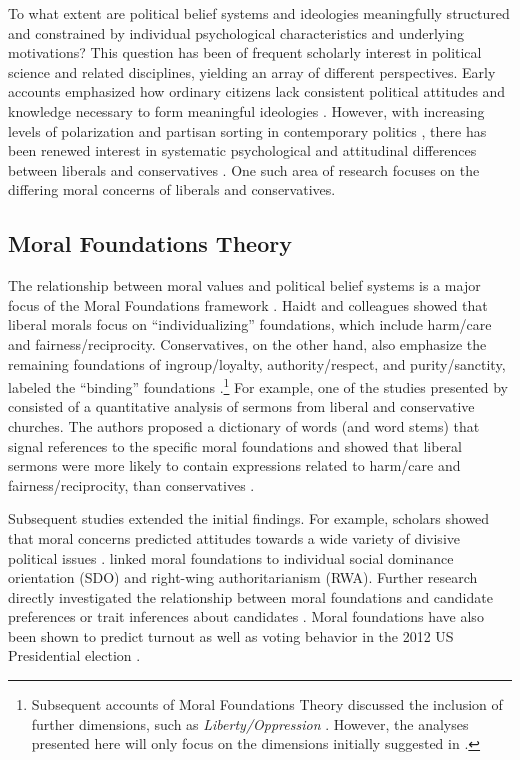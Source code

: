\documentclass[12pt]{article}
\begin{document}
To what extent are political belief systems and ideologies meaningfully structured and constrained by individual psychological characteristics and underlying motivations? This question has been of frequent scholarly interest in political science and related disciplines, yielding an array of different perspectives. Early accounts emphasized how ordinary citizens lack consistent political attitudes and knowledge necessary to form meaningful ideologies \citep[e.g.][]{converse1964nature}. However, with increasing levels of polarization and partisan sorting in contemporary politics \citep{iyengar2015fear}, there has been renewed interest in systematic psychological and attitudinal differences between liberals and conservatives \citep{jost2006end}. One such area of research focuses on the differing moral concerns of liberals and conservatives.


\subsection{Moral Foundations Theory}

The relationship between moral values and political belief systems is a major focus of the Moral Foundations framework \citep[c.f.][]{haidt2012righteous}. Haidt and colleagues showed that liberal morals focus on ``individualizing'' foundations, which include harm/care and fairness/reciprocity. Conservatives, on the other hand, also emphasize the remaining foundations of ingroup/loyalty, authority/respect, and purity/sanctity, labeled the ``binding'' foundations \citep{haidt2007morality,graham2009liberals}.\footnote{Subsequent accounts of Moral Foundations Theory discussed the inclusion of further dimensions, such as \textit{Liberty/Oppression} \citep[c.f.][]{graham2013moral,haidt2012righteous}. However, the analyses presented here will only focus on the dimensions initially suggested in \citet{haidt2008moral}.} For example, one of the studies presented by \citet{graham2009liberals} consisted of a quantitative analysis of sermons from liberal and conservative churches. The authors proposed a dictionary of words (and word stems) that signal references to the specific moral foundations and showed that liberal sermons were more likely to contain expressions related to harm/care and fairness/reciprocity, than conservatives \citep[see also][for multi-dimensional conceptualizations of ideology]{haidt2009above}.

Subsequent studies extended the initial findings. For example, scholars showed that moral concerns predicted attitudes towards a wide variety of divisive political issues \citep[e.g.][]{koleva2012tracing,low2015moral}. \citet{federico2013mapping} linked moral foundations to individual social dominance orientation (SDO) and right-wing authoritarianism (RWA). Further research directly investigated the relationship between moral foundations and candidate preferences \citep{iyer2010beyond} or trait inferences about candidates \citep{clifford2014linking}. Moral foundations have also been shown to predict turnout \citep{johnson2014ideology} as well as voting behavior in the 2012 US Presidential election \citep{franks2015using}.
\end{document}
